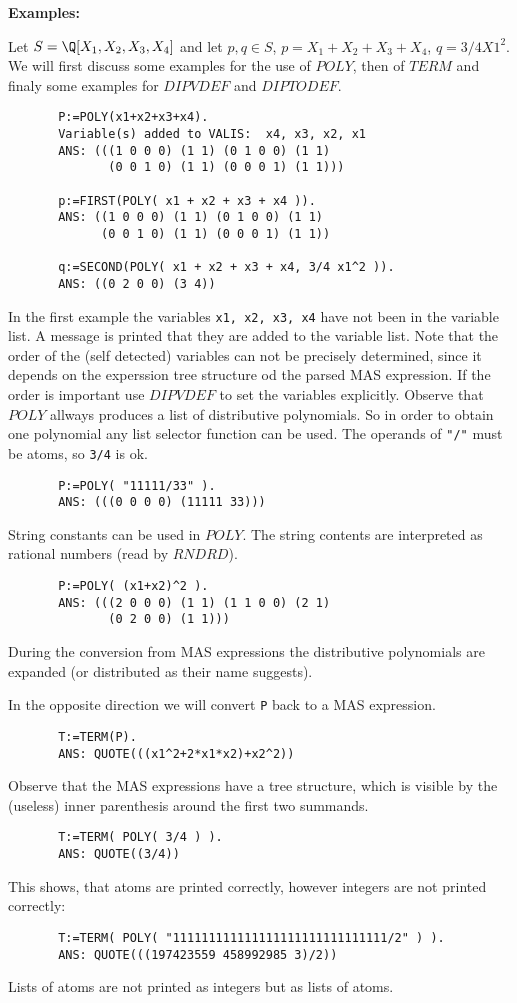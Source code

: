 {\bf Examples:} 

Let $S = \Q\lbrack X_1, X_2, X_3, X_4 \rbrack$
and let $p, q \in S$, $p = X_1 + X_2 + X_3 + X_4$, 
$q = 3/4 X1^2$. 
We will first discuss some examples for the use 
of $POLY$, then of $TERM$ and finaly some examples for 
$DIPVDEF$ and $DIPTODEF$.
\begin{verbatim}
       P:=POLY(x1+x2+x3+x4).
       Variable(s) added to VALIS:  x4, x3, x2, x1 
       ANS: (((1 0 0 0) (1 1) (0 1 0 0) (1 1) 
              (0 0 1 0) (1 1) (0 0 0 1) (1 1)))

       p:=FIRST(POLY( x1 + x2 + x3 + x4 )).
       ANS: ((1 0 0 0) (1 1) (0 1 0 0) (1 1) 
             (0 0 1 0) (1 1) (0 0 0 1) (1 1))

       q:=SECOND(POLY( x1 + x2 + x3 + x4, 3/4 x1^2 )).
       ANS: ((0 2 0 0) (3 4))
\end{verbatim}
In the first example the variables \verb/x1, x2, x3, x4/ 
have not been in the variable list.
A message is printed that they are added to the variable list.
Note that the order of the (self detected) variables 
can not be precisely determined, since it depends on the 
experssion tree structure od the parsed MAS expression. 
If the order is important use $DIPVDEF$ to set the 
variables explicitly.
Observe that $POLY$ allways produces a list of 
distributive polynomials. So in order to obtain one 
polynomial any list selector function can be used. 
The operands of \verb."/". must be atoms, so \verb.3/4. is ok. 
\begin{verbatim}
       P:=POLY( "11111/33" ).
       ANS: (((0 0 0 0) (11111 33))) 
\end{verbatim}
String constants can be used in $POLY$. The string contents 
are interpreted as rational numbers (read by $RNDRD$).
\begin{verbatim}
       P:=POLY( (x1+x2)^2 ).
       ANS: (((2 0 0 0) (1 1) (1 1 0 0) (2 1) 
              (0 2 0 0) (1 1))) 
\end{verbatim}
During the conversion from MAS expressions 
the distributive polynomials are expanded 
(or distributed as their name suggests). 

In the opposite direction we will convert \verb/P/ back 
to a MAS expression.
\begin{verbatim}
       T:=TERM(P).
       ANS: QUOTE(((x1^2+2*x1*x2)+x2^2)) 
\end{verbatim}
Observe that the MAS expressions have a tree structure, 
which is visible by the (useless) inner parenthesis 
around the first two summands.  
\begin{verbatim}
       T:=TERM( POLY( 3/4 ) ).
       ANS: QUOTE((3/4)) 
\end{verbatim}
This shows, that atoms are printed correctly, 
however integers are not printed correctly:
\begin{verbatim}
       T:=TERM( POLY( "111111111111111111111111111111/2" ) ).
       ANS: QUOTE(((197423559 458992985 3)/2)) 
\end{verbatim}
Lists of atoms are not printed as integers but 
as lists of atoms.

